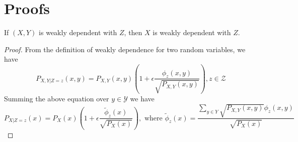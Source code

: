 \section{Proofs}
\begin{lemma}\label{lem:xyz}
If $(X,Y)$ is weakly dependent with $Z$, then $X$ is weakly dependent with $Z$.
\end{lemma}
\begin{proof}
From the definition of weakly dependence for two random variables, we have
\begin{equation}
P_{X,Y|Z=z}(x,y) = P_{X,Y}(x,y)(1+\epsilon \frac{\phi_z(x,y)}{\sqrt{P_{X,Y}(x,y)}}), z \in \mathcal{Z}
\end{equation}
Summing the above equation over $y\in \mathcal{Y}$ we have
\begin{equation}
P_{X|Z=z}(x) = P_X(x)(1+\epsilon\frac{\tilde{\phi}_z(x)}{\sqrt{P_X(x)}}),
\textrm{ where } \tilde{\phi}_z(x) = \frac{\sum_{y\in Y} \sqrt{P_{X,Y}(x,y) }\phi_z(x,y)}{\sqrt{P_X(x)}}
\end{equation}
\end{proof}
